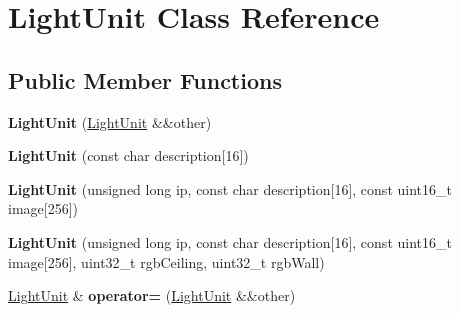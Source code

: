 \hypertarget{classLightUnit}{}\section{Light\+Unit Class Reference}
\label{classLightUnit}
\subsection*{Public Member Functions}
\begin{DoxyCompactItemize}
\item 
{\bfseries Light\+Unit} (\hyperlink{classLightUnit}{Light\+Unit} \&\&other)\hypertarget{classLightUnit_a171818bc7fbf21a112582ab66c39dedc}{}\label{classLightUnit_a171818bc7fbf21a112582ab66c39dedc}

\item 
{\bfseries Light\+Unit} (const char description\mbox{[}16\mbox{]})\hypertarget{classLightUnit_aa44c2d7b6e764c9bbca0f5ab19a31553}{}\label{classLightUnit_aa44c2d7b6e764c9bbca0f5ab19a31553}

\item 
{\bfseries Light\+Unit} (unsigned long ip, const char description\mbox{[}16\mbox{]}, const uint16\+\_\+t image\mbox{[}256\mbox{]})\hypertarget{classLightUnit_afb696351f25e3766eb18d6ce31f97fa6}{}\label{classLightUnit_afb696351f25e3766eb18d6ce31f97fa6}

\item 
{\bfseries Light\+Unit} (unsigned long ip, const char description\mbox{[}16\mbox{]}, const uint16\+\_\+t image\mbox{[}256\mbox{]}, uint32\+\_\+t rgb\+Ceiling, uint32\+\_\+t rgb\+Wall)\hypertarget{classLightUnit_ab91f948d033d6982b4b981aea104b1d7}{}\label{classLightUnit_ab91f948d033d6982b4b981aea104b1d7}

\item 
\hyperlink{classLightUnit}{Light\+Unit} \& {\bfseries operator=} (\hyperlink{classLightUnit}{Light\+Unit} \&\&other)\hypertarget{classLightUnit_a8c06848d212e79eecdada6751284a484}{}\label{classLightUnit_a8c06848d212e79eecdada6751284a484}

\end{DoxyCompactItemize}
